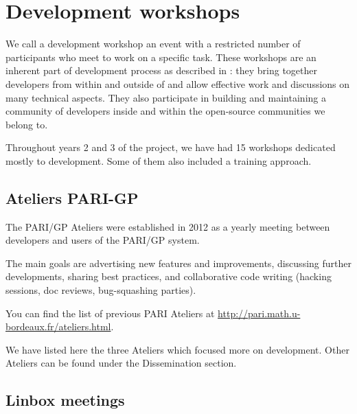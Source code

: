 \documentclass{deliverablereport}
\author{Viviane Pons et al.}
\begin{document}
\maketitle
\githubissuedescription
\newpage
\tableofcontents

\section{Development workshops}

We call a development workshop an event with a restricted number of participants
who meet to work on a specific task. These workshops are an inherent part
of \ODK development process as described in :
 they bring together
developers from within and outside of \ODK and allow effective work
and discussions on many technical aspects. They also participate in building
and maintaining a community of developers inside \ODK and within the
open-source communities we belong to.

Throughout years 2 and 3 of the project, we have had 15 workshops dedicated mostly
to development. Some of them also included a training approach. 

\subsection{Ateliers PARI-GP}

The PARI/GP Ateliers were established in 2012 as a yearly meeting
between developers and users of the PARI/GP system.

The main goals are advertising new features and improvements,
discussing further developments, sharing best practices, and collaborative
code writing (hacking sessions, doc reviews, bug-squashing parties).

You can find the list of previous PARI Ateliers at
\url{http://pari.math.u-bordeaux.fr/ateliers.html}.

We have listed here the three Ateliers which focused more on development. 
Other Ateliers can be found under the Dissemination section.







\subsection{Linbox meetings}
\end{document}
